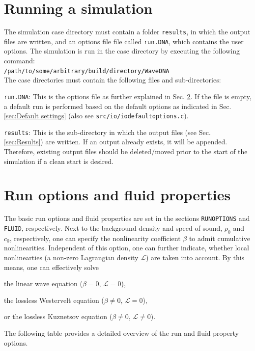 \section{Running a simulation}
\label{sec:Running a simulation}

The simulation case directory must contain a folder {\tt results}, in which the output files are written, and an options file file called {\tt run.DNA}, which contains the user options. The simulation is run in the case directory by executing the following command:
\\[8pt]
{\tt /path/to/some/arbitrary/build/directory/WaveDNA}
\\[8pt]
The case directories must contain the following files and sub-directories:
\begin{compactitem}
\item {\tt run.DNA}: This is the options file as further explained in Sec. \ref{sec:Run options and fluid properties}. If the file is empty, a default run is performed based on the default options as indicated in Sec. \ref{sec:Default settings} (also see {\tt src/io/iodefaultoptions.c}).
\item {\tt results}: This is the sub-directory in which the output files (see Sec. \ref{sec:Results}) are written. If an output already exists, it will be appended. Therefore, existing output files should be deleted/moved prior to the start of the simulation if a clean start is desired.
\end{compactitem}



\section{Run options and fluid properties}
\label{sec:Run options and fluid properties}

The basic run options and fluid properties are set in the sections {\tt RUNOPTIONS} and {\tt FLUID}, respectively. Next to the background density and speed of sound, $\rho_0$ and $c_0$, respectively, one can specify the nonlinearity coefficient $\beta$ to admit cumulative nonlinearities. Independent of this option, one can further indicate, whether local nonlinearties (a non-zero Lagrangian density $\mathcal{L}$) are taken into account. By this means, one can effectively solve
\begin{compactitem}
\item the linear wave equation ($\beta = 0$, $\mathcal{L}=0$),
\item the lossless Westervelt equation ($\beta \neq 0$, $\mathcal{L}=0$),
\item or the lossless Kuznetsov equation ($\beta \neq 0$, $\mathcal{L}\neq 0$).
\end{compactitem}
The following table provides a detailed overview of the run and fluid property options.

